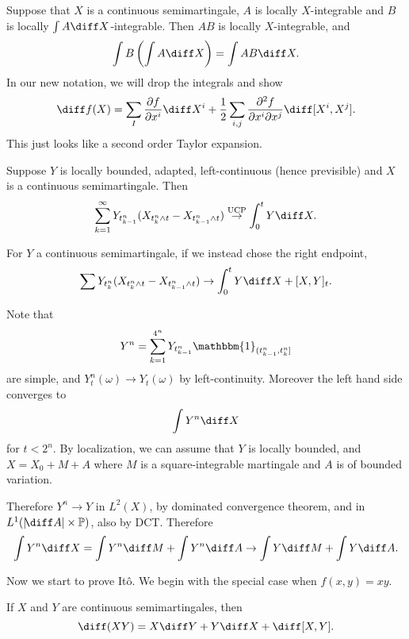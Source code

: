 \documentclass[12pt]{article}
\begin{document}
Suppose that $X$ is a continuous semimartingale, $A$ is locally $X$-integrable and $B$ is locally $\int A \diff X$-integrable. Then $AB$ is locally $X$-integrable, and
\[
\int B \left( \int A \diff X \right) = \int A B \diff X.
\]
In our new notation, we will drop the integrals and show
\[
	\diff f(X) = \sum_I \frac{\partial f}{\partial x^{i}} \diff X^{i} + \frac 12 \sum_{i, j} \frac{\partial^2 f}{\partial x^{i} \partial x^{j}} \diff [X^{i}, X^{j}].
\]
This just looks like a second order Taylor expansion.

\begin{proposition}
	Suppose $Y$ is locally bounded, adapted, left-continuous (hence previsible) and $X$ is a continuous semimartingale. Then
	\[
		\sum_{k = 1}^{\infty} Y_{t_{k-1}^{n}} (X_{t_{k}^{n} \wedge t} - X_{t_{k-1}^{n} \wedge t} ) \overset{\mathrm{UCP}}\to \int_0^{t} Y \diff X.
	\]
\end{proposition}

\begin{remark}
	For $Y$ a continuous semimartingale, if we instead chose the right endpoint,
	\[
		\sum Y_{t_k^{n}} (X_{t_k^{n} \wedge t} - X_{t_{k-1}^{n} \wedge t} ) \to \int_0^{t} Y \diff X + [X, Y]_t.
	\]
\end{remark}
\begin{proofbox}
	Note that
	\[
		Y^{n} = \sum_{k=1}^{4^{n}} Y_{t_{k-1}^{n}} \mathbbm{1}_{(t_{k-1}^{n}, t_k^{n}]}
	\]
	are simple, and $Y_t^{n}(\omega) \to Y_t(\omega)$ by left-continuity. Moreover the left hand side converges to
	\[
	\int Y^{n} \diff X
	\]
	for $t < 2^{n}$. By localization, we can assume that $Y$ is locally bounded, and $X = X_0 + M + A$ where $M$ is a square-integrable martingale and $A$ is of bounded variation.

	Therefore $Y^{n} \to Y$ in $L^2(X)$, by dominated convergence theorem, and in $L^{1}(|\! \diff A| \times \mathbb{P})$, also by DCT. Therefore
	\[
	\int Y^{n} \diff X = \int Y^{n} \diff M + \int Y^{n} \diff A \to \int Y \diff M + \int Y \diff A.
	\]
\end{proofbox}

Now we start to prove It\^o. We begin with the special case when $f(x, y) = xy$.

\begin{proposition}
	If $X$ and $Y$ are continuous semimartingales, then
	\[
		\diff (XY) = X \diff Y + Y \diff X + \diff [X, Y].
	\]
\end{proposition}
\end{document}
